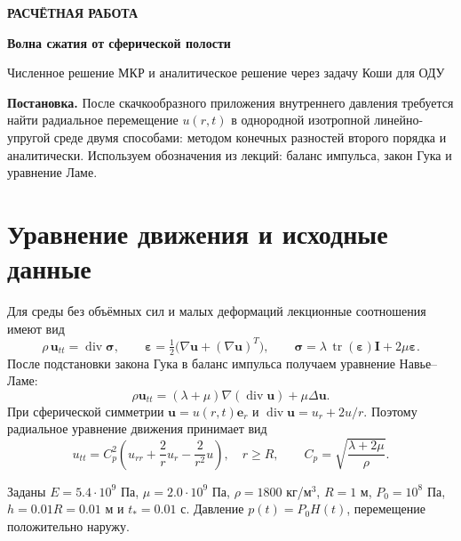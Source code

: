 \documentclass[11pt,a4paper]{article}
\begin{document}
\begin{center}
{\sffamily\small\color{teal}\bfseries РАСЧЁТНАЯ РАБОТА}\par\vspace{3pt}
{\sffamily\LARGE\bfseries\color{navy} Волна сжатия от сферической полости}\par\vspace{5pt}
{\small Численное решение МКР и аналитическое решение через задачу Коши для ОДУ}
\end{center}
\vspace{2mm}
\begin{notebox}
\textbf{Постановка.} После скачкообразного приложения внутреннего давления требуется найти радиальное перемещение $u(r,t)$ в однородной изотропной линейно-упругой среде двумя способами: методом конечных разностей второго порядка и аналитически. Используем обозначения из лекций: баланс импульса, закон Гука и уравнение Ламе.
\end{notebox}

\section{Уравнение движения и исходные данные}

Для среды без объёмных сил и малых деформаций лекционные соотношения имеют вид
\begin{equation*}
\rho\,\mathbf u_{tt}=\operatorname{div}\boldsymbol\sigma,\qquad
\boldsymbol\varepsilon=\tfrac12\bigl(\nabla\mathbf u+(\nabla\mathbf u)^T\bigr),\qquad
\boldsymbol\sigma=\lambda\,\operatorname{tr}(\boldsymbol\varepsilon)\mathbf I+2\mu\boldsymbol\varepsilon.
\end{equation*}
После подстановки закона Гука в баланс импульса получаем уравнение Навье--Ламе:
\begin{equation*}
\rho\mathbf u_{tt}=(\lambda+\mu)\nabla(\operatorname{div}\mathbf u)+\mu\Delta\mathbf u.
\end{equation*}
При сферической симметрии $\mathbf u=u(r,t)\mathbf e_r$ и $\operatorname{div}\mathbf u=u_r+2u/r$. Поэтому радиальное уравнение движения принимает вид
\begin{equation}\label{eq:wave}
 u_{tt}=C_p^2\left(u_{rr}+\frac{2}{r}u_r-\frac{2}{r^2}u\right),\quad r\ge R,\qquad C_p=\sqrt{\frac{\lambda+2\mu}{\rho}}.
\end{equation}

Заданы $E=5.4\cdot10^9$ Па, $\mu=2.0\cdot10^9$ Па, $\rho=1800$ кг/м$^3$, $R=1$ м, $P_0=10^8$ Па, $h=0.01R=0.01$ м и $t_*=0.01$ с. Давление $p(t)=P_0H(t)$, перемещение положительно наружу.
\end{document}
